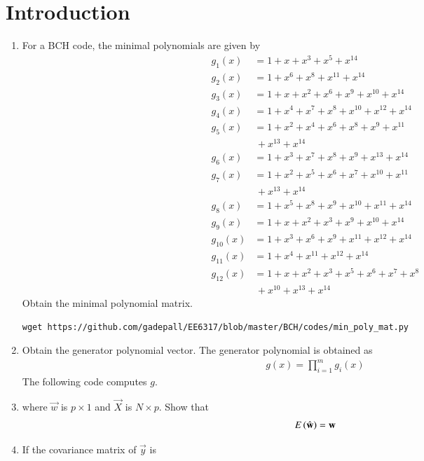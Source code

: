 \documentclass[journal,12pt,twocolumn]{IEEEtran}
\renewcommand\thesection{\arabic{section}}
\begin{document}
\section{Introduction}
\begin{enumerate}[label=\thesection.\arabic*
,ref=\thesection.\theenumi]
\item For a BCH code, the minimal polynomials are given by 
\begin{align}
g_1(x)&=1+x+x^3+x^5+x^{14}\\
g_2(x)&=1+x^6+x^8+x^{11}+x^{14}\\
g_3(x)&=1+x+x^2+x^6+x^9+x^{10}+x^{14}\\
g_4(x)&=1+x^4+x^7+x^8+x^10+x^{12}+x^{14}\\
g_5(x)&=1+x^2+x^4+x^6+x^8+x^9+x^{11}
\nonumber \\
&\,+x^{13}+x^{14}\\
g_6(x)&=1+x^3+x^7+x^8+x^9+x^{13}+x^{14}\\
g_7(x)&=1+x^2+x^5+x^6+x^7+x^{10}+x^{11}
\nonumber \\
&\,+x^{13}+x^{14}\\
g_8(x)&=1+x^5+x^8+x^9+x^{10}+x^{11}+x^{14}\\
g_9(x)&=1+x+x^2+x^3+x^9+x^{10}+x^{14}\\
g_{10}(x)&=1+x^3+x^6+x^9+x^{11}+x^{12}+x^{14}\\
g_{11}(x)&=1+x^4+x^{11}+x^{12}+x^{14}\\
g_{12}(x)&=1+x+x^2+x^3+x^5+x^6+x^7+x^8
\nonumber \\
&\,+x^{10}+x^{13}+x^{14}
\end{align}
Obtain the minimal polynomial matrix.
\\
\solution
\begin{lstlisting}
wget https://github.com/gadepall/EE6317/blob/master/BCH/codes/min_poly_mat.py
\end{lstlisting}
\item Obtain the generator polynomial vector.
\solution The generator polynomial is obtained as
\begin{align}
g(x) =\prod_{i = 1}^{m}g_i(x)
\end{align}
%
The following code computes $g$.
\item 
where $\vec{w}$ is $p \times 1$ and $\vec{X}$ is $N \times p$.  Show that
\begin{align}
E\left(\hat{\mathbf{w}}\right) = \mathbf{w}
\end{align}
%
\item If the covariance matrix of $\vec{y}$ is
\begin{align}

\end{align}
\end{enumerate}
\end{document}
